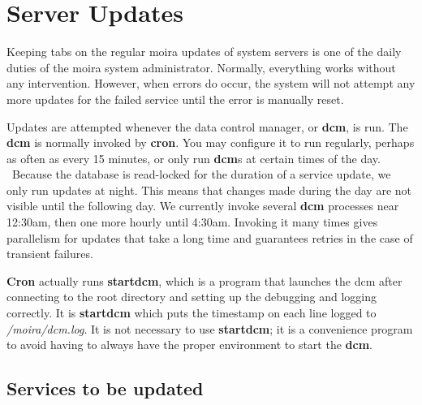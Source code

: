\documentclass{book}
\begin{document}
\section{Server Updates}

Keeping tabs on the regular moira updates of system servers is one of
the daily duties of the moira system administrator.  Normally,
everything works without any intervention.  However, when errors do
occur, the system will not attempt any more updates for the failed
service until the error is manually reset.

Updates are attempted whenever the data control manager, or {\bf dcm},
is run.  The {\bf dcm} is normally invoked by {\bf cron}.  You may
configure it to run regularly, perhaps as often as every 15 minutes,
or only run {\bf dcm}s at certain times of the day.  \athena\ Because
the database is read-locked for the duration of a service update, we
only run updates at night.  This means that changes made during the
day are not visible until the following day.  We currently invoke
several {\bf dcm} processes near 12:30am, then one more hourly until
4:30am.  Invoking it many times gives parallelism for updates that
take a long time and guarantees retries in the case of transient
failures.

{\bf Cron} actually runs {\bf startdcm}, which is a
program that launches the dcm after connecting to the root directory
and setting up the debugging and logging correctly.  It is
{\bf startdcm} which puts the timestamp on each line logged to
{\em /moira/dcm.log}.  It is not necessary to use {\bf startdcm}; it is a
convenience program to avoid having to always have the proper
environment to start the {\bf dcm}.

\subsection{Services to be updated}
\end{document}
